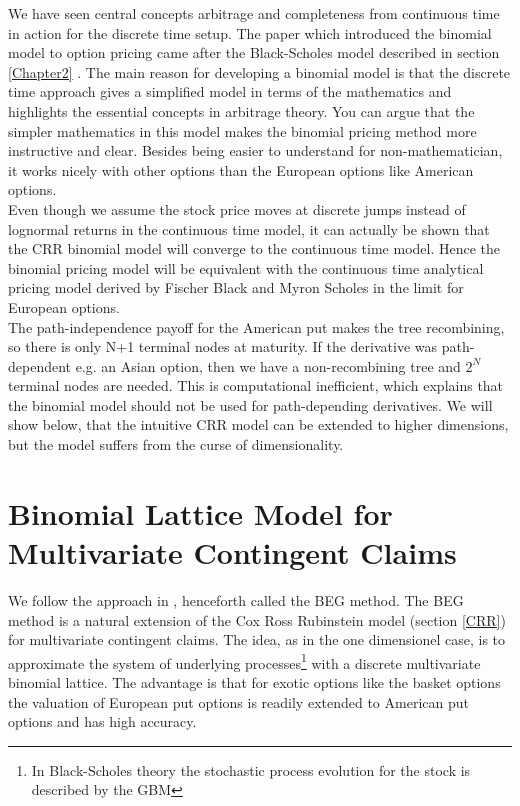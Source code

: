 We have seen central concepts arbitrage and completeness from continuous time in action for the discrete time setup. The paper \parencite{CRR} which introduced the binomial model to option pricing came after the Black-Scholes model described in section \ref{Chapter2} \parencite{B-S-Paper}. The main reason for developing a binomial model is that the discrete time approach gives a simplified model in terms of the mathematics and highlights the essential concepts in arbitrage theory. You can argue that the simpler mathematics in this model makes the binomial pricing method more instructive and clear. Besides being easier to understand for non-mathematician, it works nicely with other options than the European options like American options. \\

Even though we assume the stock price moves at discrete jumps instead of lognormal returns in the continuous time model, it can actually be shown that the CRR binomial model will converge to the continuous time model. Hence the binomial pricing model will be equivalent with the continuous time analytical pricing model derived by Fischer Black and Myron Scholes in the limit for European options. \\

The path-independence payoff for the American put makes the tree recombining, so there is only N+1 terminal nodes at maturity. If the derivative was path-dependent e.g. an Asian option, then we have a non-recombining tree and $2^{N}$ terminal nodes are needed. This is computational inefficient, which explains that the binomial model should not be used for path-depending derivatives. We will show below, that the intuitive CRR model can be extended to higher dimensions, but the model suffers from the curse of dimensionality.

\newpage
\section{Binomial Lattice Model for Multivariate Contingent Claims}
We follow the approach in \parencite{BEG}, henceforth called the BEG method. The BEG method is a natural extension of the Cox Ross Rubinstein model (section \ref{CRR}) for multivariate contingent claims. The idea, as in the one dimensionel case, is to approximate the system of underlying processes\footnote{In Black-Scholes theory the stochastic process evolution for the stock is described by the GBM} with a discrete multivariate binomial lattice. The advantage is that for exotic options like the basket options the valuation of European put options is readily extended to American put options and has high accuracy. \\

